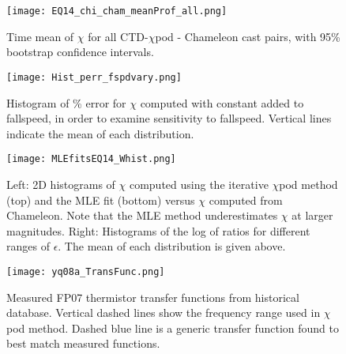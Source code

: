 \documentclass{ametsoc}
\begin{document}
\begin{figure}[t]
  \noindent\texttt{[image: EQ14\_chi\_cham\_meanProf\_all.png]}\\
  \caption{Time mean of $\chi$ for all CTD-$\chi$pod - Chameleon cast pairs, with 95\% bootstrap confidence intervals.}
  \label{ctd_cham_chi_boot_all}
\end{figure}

\begin{figure}[t]
  \noindent\texttt{[image: Hist\_perr\_fspdvary.png]}\\
  \caption{Histogram of \% error for $\chi$ computed with constant added to fallspeed, in order to examine sensitivity to fallspeed. Vertical lines indicate the mean of each distribution.}
  \label{FspdSensHist}
\end{figure}

\begin{figure}[t]
  \noindent\texttt{[image: MLEfitsEQ14\_Whist.png]}\\
  \caption{Left: 2D histograms of $\chi$ computed using the iterative $\chi$pod method (top) and the MLE fit (bottom) versus $\chi$ computed from Chameleon. Note that the MLE method underestimates $\chi$ at larger magnitudes. Right: Histograms of the log of ratios for different ranges of $\epsilon$. The mean of each distribution is given above.}
  \label{mlefits}
\end{figure}


\begin{figure}[t]
  \noindent\texttt{[image: yq08a\_TransFunc.png]}\\
  \caption{Measured FP07 thermistor transfer functions from historical database. Vertical dashed lines show the frequency range used in $\chi$pod method. Dashed blue line is a generic transfer function found to best match measured functions.}
  \label{xfr}
\end{figure}
\end{document}
